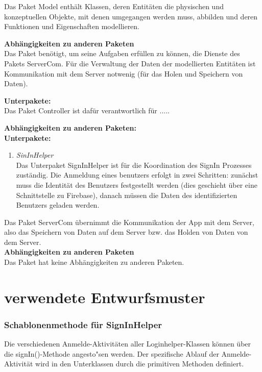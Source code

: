 \documentclass[11pt,a4paper]{report}
\begin{document}
Das Paket Model enthält Klassen, deren Entitäten die physischen und konzeptuellen Objekte, mit denen umgegangen werden muss, abbilden und deren Funktionen und Eigenschaften modellieren.

\textbf{Abhängigkeiten zu anderen Paketen}\\
Das Paket benötigt, um seine Aufgaben erfüllen zu können, die Dienste des Pakets ServerCom. Für die Verwaltung der Daten der modellierten Entitäten ist Kommunikation mit dem Server notwenig (für das Holen und Speichern von Daten).

\textbf{Unterpakete:}\\

Das Paket Controller ist dafür verantwortlich für .....

\textbf{Abhängigkeiten zu anderen Paketen:}\\


\textbf{Unterpakete:}\\
\begin{enumerate}
	\item \textit{SinInHelper}\\
	Das Unterpaket SignInHelper ist für die Koordination des SignIn Prozesses zuständig. Die Anmeldung eines benutzers erfolgt in zwei Schritten: zunächst muss die Identität des Benutzers festgestellt werden (dies geschieht über eine Schnittstelle zu Firebase), danach müssen die Daten des identifizierten Benutzers geladen werden.
\end{enumerate}

Das Paket ServerCom übernimmt die Kommunikation der App mit dem Server, also das Speichern von Daten auf dem Server bzw. das Holden von Daten von dem Server.\\

\textbf{Abhängigkeiten zu anderen Paketen}\\
Das Paket hat keine Abhängigkeiten zu anderen Paketen.


\section{verwendete Entwurfsmuster}

\subsubsection{Schablonenmethode für SignInHelper}
Die verschiedenen Anmelde-Aktivitäten aller Loginhelper-Klassen können über die signIn()-Methode angesto"sen werden. Der spezifische Ablauf der Anmelde-Aktivität wird in den Unterklassen durch die primitiven Methoden definiert. \\
\end{document}

